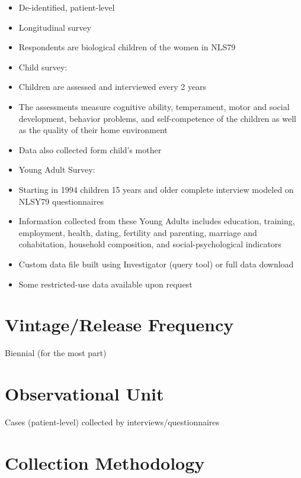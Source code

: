 \documentclass[
]{book}
\providecommand{\tightlist}{%
  \setlength{\itemsep}{0pt}\setlength{\parskip}{0pt}}
\begin{document}
\begin{itemize}
\tightlist
\item
  De-identified, patient-level
\item
  Longitudinal survey
\item
  Respondents are biological children of the women in NLS79
\item
  Child survey:
\item
  Children are assessed and interviewed every 2 years
\item
  The assessments measure cognitive ability, temperament, motor and social development, behavior problems, and self-competence of the children as well as the quality of their home environment
\item
  Data also collected form child's mother
\item
  Young Adult Survey:
\item
  Starting in 1994 children 15 years and older complete interview modeled on NLSY79 questionnaires
\item
  Information collected from these Young Adults includes education, training, employment, health, dating, fertility and parenting, marriage and cohabitation, household composition, and social-psychological indicators
\item
  Custom data file built using Investigator (query tool) or full data download
\item
  Some restricted-use data available upon request
\end{itemize}

\hypertarget{vintagerelease-frequency-58}{%
\section{Vintage/Release Frequency}\label{vintagerelease-frequency-58}}

Biennial (for the most part)

\hypertarget{observational-unit-58}{%
\section{Observational Unit}\label{observational-unit-58}}

Cases (patient-level) collected by interviews/questionnaires

\hypertarget{collection-methodology-58}{%
\section{Collection Methodology}\label{collection-methodology-58}}
\end{document}
